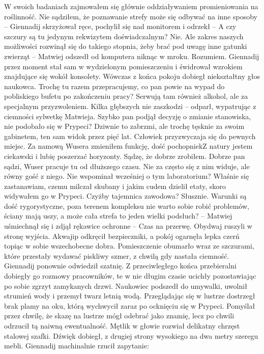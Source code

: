 \documentclass[../MAIN.tex]{subfiles}
\begin{document}
\xx W swoich badaniach zajmowałem się głównie oddziaływaniem promieniowania na roślinność. Nie sądziłem, że poznawanie strefy może się odbywać na inne sposoby -- Giennadij skrzyżował ręce, pochylił się nad monitorem i odrzekł -- A czy szczury są tu jedynym rekwizytem doświadczalnym? 
\xx Nie. Ale zakres naszych możliwości rozwinął się do takiego stopnia, żeby brać pod uwagę inne gatunki zwierząt -- Matwiej odszedł od komputera niknąc w mroku. 
\xx Rozumiem. 
Giennadij przez moment stał sam w wydzielonym pomieszczeniu i świdrował wzrokiem znajdujące się wokół konsolety. Wówczas z końca pokoju dobiegł niekształtny głos naukowca. 
\xx Trochę tu razem przepracujemy, co pan powie na wypad do pobliskiego bufetu po zakończeniu pracy? Serwują tam również alkohol, ale za specjalnym przyzwoleniem. 
\xx Kilka głębszych nie zaszkodzi -- odparł, wypatrując z ciemności sylwetkę Matwieja. 
\xx Szybko pan podjął decyzję o zmianie stanowiska, nie podobało się w Prypeci? 
\xx Dziwnie to zabrzmi, ale trochę tęsknie za swoim gabinetem, ten sam widok przez pięć lat. Człowiek przyzwyczaja się do pewnych miejsc. Za namową Wusera zmieniłem funkcję, dość pochopnie\3kZ natury jestem ciekawski i lubię poszerzać horyzonty. Sądzę, że dobrze zrobiłem. 
\xx Dobrze pan sądzi, Wuser pracuje tu od dłuższego czasu. Nie za często się z nim widuje, ale równy gość z niego. Nie wspominał wcześniej o tym laboratorium? 
\xx Właśnie się zastanawiam, czemu milczał skubany i jakim cudem dzielił etaty, skoro widywałem go w Prypeci. Czyżby tajemnica zawodowa? 
\xx Słusznie. Warunki są dość rygorystyczne, poza terenem kompleksu nie warto sobie robić problemów, ściany mają uszy, a może cała strefa to jeden wielki podsłuch? -- Matwiej uśmiechnął się i zdjął rękawice ochronne -- Czas na przerwę. 
\qd
Obydwaj ruszyli w stronę wyjścia. Akwajip odkręcił bezpieczniki, a pokój ogarnęła lepka czerń topiąc w sobie wszechobecne dobra. Pomieszczenie obumarło wraz ze szczurami, które przestały wydawać piskliwy szmer, z chwilą gdy nastała ciemność. Giennadij ponownie odwiedził szatnię. Z przeciwległego końca przebieralni dobiegły go rozmowy pracowników, te w nie długim czasie ucichły pozostawiając po sobie zgrzyt zamykanych drzwi. Naukowiec podszedł do umywalki, uwolnił strumień wody i przemył twarz letnią wodą. Przeglądając się w lustrze dostrzegł brak plamy na oku, którą wychwycił zaraz po ocknięciu się w Prypeci. Pomyślał przez chwilę, że skazę na lustrze mógł odebrać jako znamię, lecz po chwili odrzucił tą naiwną ewentualność. Mętlik w głowie rozwiał delikatny chrzęst stalowej szafki. Dźwięk dobiegł, z drugiej strony wysokiego na dwa metry szeregu mebli. Giennadij machinalnie rzucił zapytanie: 
\end{document}
